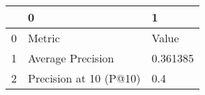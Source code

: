 \begin{tabular}{lll}
\toprule
{} &                       0 &         1 \\
\midrule
0 &                  Metric &     Value \\
1 &       Average Precision &  0.361385 \\
2 &  Precision at 10 (P@10) &       0.4 \\
\bottomrule
\end{tabular}
